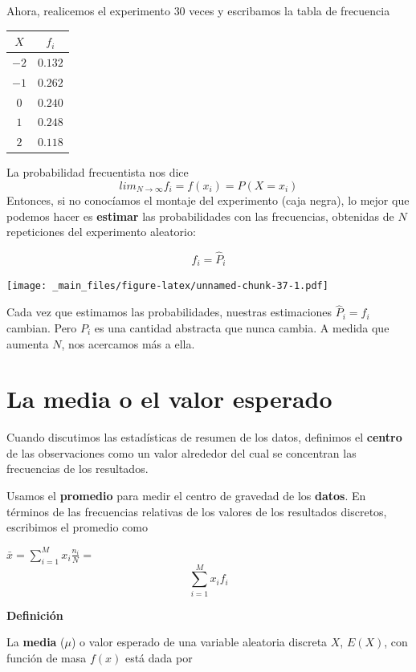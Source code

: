 \documentclass[
]{book}
\begin{document}
Ahora, realicemos el experimento \(30\) veces y escribamos la tabla de frecuencia

\begin{longtable}[]{@{}cc@{}}
\toprule\noalign{}
\(X\) & \(f_i\) \\
\midrule\noalign{}
\endhead
\bottomrule\noalign{}
\endlastfoot
\(-2\) & \(0.132\) \\
\(-1\) & \(0.262\) \\
\(0\) & \(0.240\) \\
\(1\) & \(0.248\) \\
\(2\) & \(0.118\) \\
\end{longtable}

La probabilidad frecuentista nos dice
\[lim_{N \rightarrow \infty} f_i = f(x_i)=P(X=x_i)\]
Entonces, si no conocíamos el montaje del experimento (caja negra), lo mejor que podemos hacer es \textbf{estimar} las probabilidades con las frecuencias, obtenidas de \(N\) repeticiones del experimento aleatorio:

\[f_i = \hat{P}_i\]

\texttt{[image: \_main\_files/figure-latex/unnamed-chunk-37-1.pdf]}

Cada vez que estimamos las probabilidades, nuestras estimaciones \(\hat{P}_i=f_i\) cambian. Pero \(P_i\) es una cantidad abstracta que nunca cambia. A medida que aumenta \(N\), nos acercamos más a ella.

\hypertarget{la-media-o-el-valor-esperado}{%
\section{La media o el valor esperado}\label{la-media-o-el-valor-esperado}}

Cuando discutimos las estadísticas de resumen de los datos, definimos el \textbf{centro} de las observaciones como un valor alrededor del cual se concentran las frecuencias de los resultados.

Usamos el \textbf{promedio} para medir el centro de gravedad de los \textbf{datos}. En términos de las frecuencias relativas de los valores de los resultados discretos, escribimos el promedio como

\(\bar{x}= \sum_{i=1}^M x_i \frac{n_i}{N}=\) \[\sum_{i=1}^M x_i f_i\]

\textbf{Definición}

La \textbf{media} (\(\mu\)) o valor esperado de una variable aleatoria discreta \(X\), \(E(X)\), con función de masa \(f(x)\) está dada por
\end{document}
